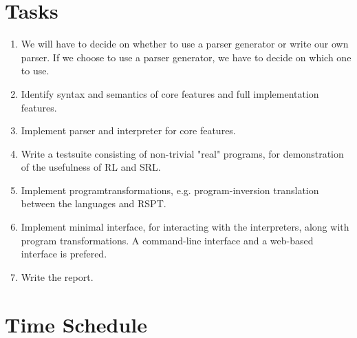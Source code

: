 \section{Tasks}
\label{sec:tasks}

\begin{enumerate}

  \item We will have to decide on whether to use a parser generator or write our own parser. If we choose to use a parser generator, we have to decide on which one to use.

  \item Identify syntax and semantics of core features and full implementation features.

  \item Implement parser and interpreter for core features.

  \item Write a testsuite consisting of non-trivial "real" programs, for demonstration of the usefulness of RL and SRL.

  \item Implement programtransformations, e.g. program-inversion translation between the languages and RSPT.

  \item Implement minimal interface, for interacting with the interpreters, along with program transformations. A command-line interface and a web-based interface is prefered.

  \item Write the report.

\end{enumerate}

\section{Time Schedule}
\label{sec:time_schedule}

